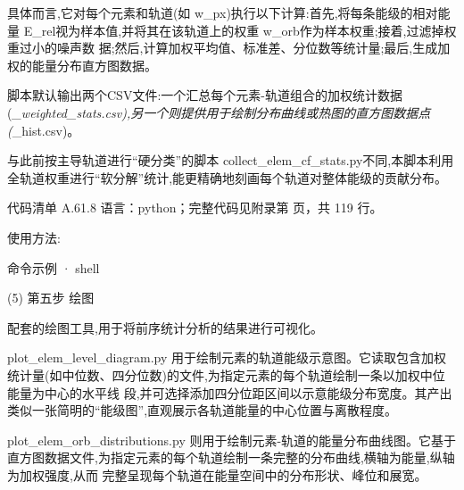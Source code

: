 \documentclass[lang=cn,scheme=chinese,color=blue,device=normal,toc=onecol,math=cm]{elegantbook}
\begin{document}
具体而言,它对每个元素和轨道(如 w\_\allowbreak{}px)执行以下计算:首先,将每条能级的相对能量 E\_\allowbreak{}rel视为样本值,并将其在该轨道上的权重 w\_\allowbreak{}orb作为样本权重;接着,过滤掉权重过小的噪声数 据;然后,计算加权平均值、标准差、分位数等统计量;最后,生成加权的能量分布直方图数据。\par


脚本默认输出两个CSV文件:一个汇总每个元素-轨道组合的加权统计数据(\emph{\_\allowbreak{}weighted\_\allowbreak{}stats.csv),另一个则提供用于绘制分布曲线或热图的直方图数据点(}\_\allowbreak{}hist.csv)。\par


与此前按主导轨道进行“硬分类”的脚本 collect\_\allowbreak{}elem\_\allowbreak{}cf\_\allowbreak{}stats.py不同,本脚本利用全轨道权重进行“软分解”统计,能更精确地刻画每个轨道对整体能级的贡献分布。\par


\begin{codeindexbox}{代码清单 A.61.8}
语言：python；完整代码见附录第 \pageref{code:61:8} 页，共 119 行。
\end{codeindexbox}


使用方法:\par


\begin{inlinecodebox}{命令示例 · shell}
\end{inlinecodebox}


(5) 第五步 绘图\par


配套的绘图工具,用于将前序统计分析的结果进行可视化。\par


plot\_\allowbreak{}elem\_\allowbreak{}level\_\allowbreak{}diagram.py 用于绘制元素的轨道能级示意图。它读取包含加权统计量(如中位数、四分位数)的文件,为指定元素的每个轨道绘制一条以加权中位能量为中心的水平线 段,并可选择添加四分位距区间以示意能级分布宽度。其产出类似一张简明的“能级图”,直观展示各轨道能量的中心位置与离散程度。\par


plot\_\allowbreak{}elem\_\allowbreak{}orb\_\allowbreak{}distributions.py 则用于绘制元素-轨道的能量分布曲线图。它基于直方图数据文件,为指定元素的每个轨道绘制一条完整的分布曲线,横轴为能量,纵轴为加权强度,从而 完整呈现每个轨道在能量空间中的分布形状、峰位和展宽。\par
\end{document}
